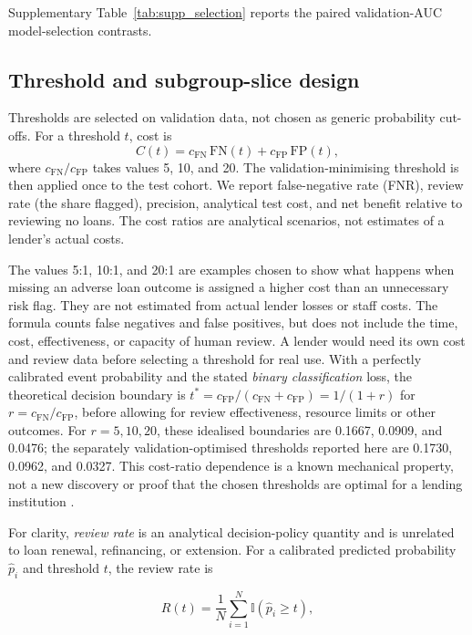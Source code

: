 \documentclass[10pt]{article}
\begin{document}
Supplementary Table~\ref{tab:supp_selection} reports the paired validation-AUC model-selection contrasts.



\subsection{Threshold and subgroup-slice design}

Thresholds are selected on validation data, not chosen as generic probability cut-offs. For a threshold $t$, cost is
\[
  C(t)=c_{\mathrm{FN}}\,\mathrm{FN}(t)+c_{\mathrm{FP}}\,\mathrm{FP}(t),
\]
where $c_{\mathrm{FN}}/c_{\mathrm{FP}}$ takes values 5, 10, and 20. The validation-minimising threshold is then applied once to the test cohort. We report false-negative rate (FNR), review rate (the share flagged), precision, analytical test cost, and net benefit relative to reviewing no loans. The cost ratios are analytical scenarios, not estimates of a lender's actual costs.

The values 5:1, 10:1, and 20:1 are examples chosen to show what happens when missing an adverse loan outcome is assigned a higher cost than an unnecessary risk flag. They are not estimated from actual lender losses or staff costs. The formula counts false negatives and false positives, but does not include the time, cost, effectiveness, or capacity of human review. A lender would need its own cost and review data before selecting a threshold for real use. With a perfectly calibrated event probability and the stated \emph{binary classification} loss, the theoretical decision boundary is $t^{*}=c_{\mathrm{FP}}/(c_{\mathrm{FN}}+c_{\mathrm{FP}})=1/(1+r)$ for $r=c_{\mathrm{FN}}/c_{\mathrm{FP}}$, before allowing for review effectiveness, resource limits or other outcomes. For $r=5,10,20$, these idealised boundaries are 0.1667, 0.0909, and 0.0476; the separately validation-optimised thresholds reported here are 0.1730, 0.0962, and 0.0327. This cost-ratio dependence is a known mechanical property, not a new discovery or proof that the chosen thresholds are optimal for a lending institution \cite{ref57,ref58}.

For clarity, \emph{review rate} is an analytical decision-policy quantity and is unrelated to loan renewal, refinancing, or extension. For a calibrated predicted probability $\hat p_i$ and threshold $t$, the review rate is

\[
R(t)=\frac{1}{N}\sum_{i=1}^{N}\mathbb{I}(\hat p_i \geq t),
\]
\end{document}

